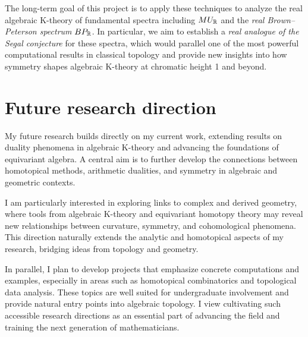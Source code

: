 \documentclass[11pt]{article}
\begin{document}
The long-term goal of this project is to apply these techniques to analyze the real algebraic K-theory of fundamental spectra including $MU_{\mathbb{R}}$ and the {\it real Brown--Peterson spectrum} $BP_{\mathbb{R}}$.
In particular, we aim to establish a {\it real analogue of the Segal conjecture} for these spectra, which would parallel one of the most powerful computational results in classical topology and provide new insights into how symmetry shapes algebraic K-theory at chromatic height 1 and beyond.


\section{Future research direction}
My future research builds directly on my current work, extending results on duality phenomena in algebraic K-theory and advancing the foundations of equivariant algebra. 
A central aim is to further develop the connections between homotopical methods, arithmetic dualities, and symmetry in algebraic and geometric contexts.

I am particularly interested in exploring links to complex and derived geometry, where tools from algebraic K-theory and equivariant homotopy theory may reveal new relationships between curvature, symmetry, and cohomological phenomena. 
This direction naturally extends the analytic and homotopical aspects of my research, bridging ideas from topology and geometry.

In parallel, I plan to develop projects that emphasize concrete computations and examples, especially in areas such as homotopical combinatorics and topological data analysis. 
These topics are well suited for undergraduate involvement and provide natural entry points into algebraic topology. 
I view cultivating such accessible research directions as an essential part of advancing the field and training the next generation of mathematicians.
\end{document}
